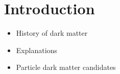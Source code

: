 \chapter{Introduction}
\label{ch:intro}

\begin{itemize}
\item History of dark matter
\item Explanations
\item Particle dark matter candidates
\end{itemize}